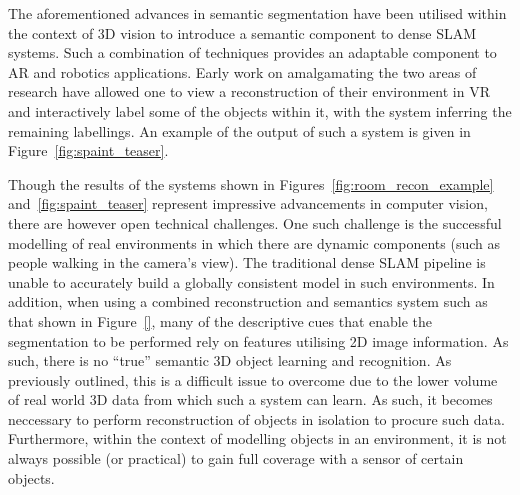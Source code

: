 The aforementioned advances in semantic segmentation have been utilised within the context of 3D vision to 
introduce a semantic component to dense SLAM systems. Such a combination of techniques provides an adaptable 
component to AR and robotics applications. Early work on amalgamating the two areas of research have allowed 
one to view a reconstruction of their environment in VR and interactively label some of the objects within 
it, with the system inferring the remaining labellings. An example of the output of such a system is given 
in Figure~\ref{fig:spaint_teaser}.

Though the results of the systems shown in Figures~\ref{fig:room_recon_example} and~\ref{fig:spaint_teaser} 
represent impressive advancements in computer vision, there are however open technical challenges. One such 
challenge is the successful modelling of real environments in which there are dynamic components (such as 
people walking in the camera's view). The traditional dense SLAM pipeline is unable to accurately build a 
globally consistent model in such environments. In addition, when using a combined reconstruction and 
semantics system such as that shown in Figure~\ref{}, many of the descriptive cues that enable the 
segmentation to be performed rely on features utilising 2D image information. As such, there is no ``true'' 
semantic 3D object learning and recognition. As previously outlined, this is a difficult issue to overcome 
due to the lower volume of real world 3D data from which such a system can learn. As such, it becomes 
neccessary to perform reconstruction of objects in isolation to procure such data. Furthermore, within the 
context of modelling objects in an environment, it is not always possible (or practical) to gain full 
coverage with a sensor of certain objects.

